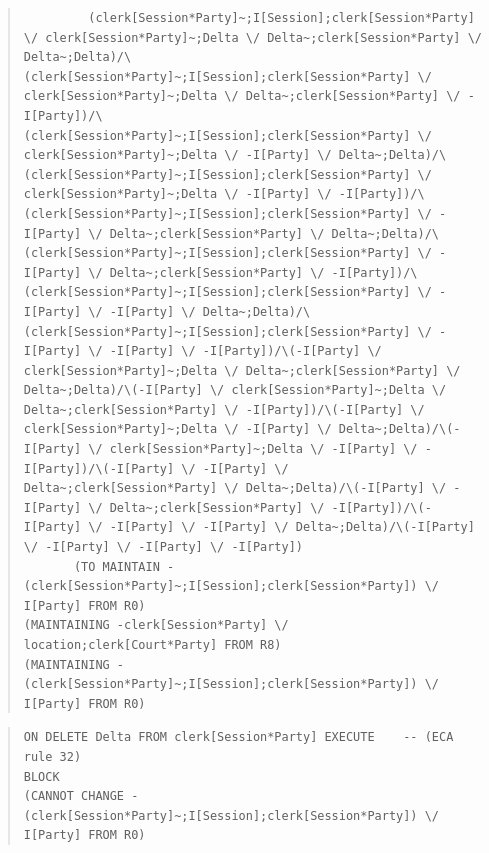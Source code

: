 \documentclass[10pt,a4paper]{report}              %
\theoremstyle{plain}\theorembodyfont{\rmfamily}\newtheorem{definition}{Definition}[section]
\theoremstyle{plain}\theorembodyfont{\rmfamily}\newtheorem{designrule}[definition]{Requirement}
\begin{document}
\begin{quote}
\begin{verbatim}
         (clerk[Session*Party]~;I[Session];clerk[Session*Party] \/ clerk[Session*Party]~;Delta \/ Delta~;clerk[Session*Party] \/ Delta~;Delta)/\(clerk[Session*Party]~;I[Session];clerk[Session*Party] \/ clerk[Session*Party]~;Delta \/ Delta~;clerk[Session*Party] \/ -I[Party])/\(clerk[Session*Party]~;I[Session];clerk[Session*Party] \/ clerk[Session*Party]~;Delta \/ -I[Party] \/ Delta~;Delta)/\(clerk[Session*Party]~;I[Session];clerk[Session*Party] \/ clerk[Session*Party]~;Delta \/ -I[Party] \/ -I[Party])/\(clerk[Session*Party]~;I[Session];clerk[Session*Party] \/ -I[Party] \/ Delta~;clerk[Session*Party] \/ Delta~;Delta)/\(clerk[Session*Party]~;I[Session];clerk[Session*Party] \/ -I[Party] \/ Delta~;clerk[Session*Party] \/ -I[Party])/\(clerk[Session*Party]~;I[Session];clerk[Session*Party] \/ -I[Party] \/ -I[Party] \/ Delta~;Delta)/\(clerk[Session*Party]~;I[Session];clerk[Session*Party] \/ -I[Party] \/ -I[Party] \/ -I[Party])/\(-I[Party] \/ clerk[Session*Party]~;Delta \/ Delta~;clerk[Session*Party] \/ Delta~;Delta)/\(-I[Party] \/ clerk[Session*Party]~;Delta \/ Delta~;clerk[Session*Party] \/ -I[Party])/\(-I[Party] \/ clerk[Session*Party]~;Delta \/ -I[Party] \/ Delta~;Delta)/\(-I[Party] \/ clerk[Session*Party]~;Delta \/ -I[Party] \/ -I[Party])/\(-I[Party] \/ -I[Party] \/ Delta~;clerk[Session*Party] \/ Delta~;Delta)/\(-I[Party] \/ -I[Party] \/ Delta~;clerk[Session*Party] \/ -I[Party])/\(-I[Party] \/ -I[Party] \/ -I[Party] \/ Delta~;Delta)/\(-I[Party] \/ -I[Party] \/ -I[Party] \/ -I[Party])
       (TO MAINTAIN -(clerk[Session*Party]~;I[Session];clerk[Session*Party]) \/ I[Party] FROM R0)
(MAINTAINING -clerk[Session*Party] \/ location;clerk[Court*Party] FROM R8)
(MAINTAINING -(clerk[Session*Party]~;I[Session];clerk[Session*Party]) \/ I[Party] FROM R0)
\end{verbatim}
\end{quote}
\begin{quote}
\begin{verbatim}
ON DELETE Delta FROM clerk[Session*Party] EXECUTE    -- (ECA rule 32)
BLOCK
(CANNOT CHANGE -(clerk[Session*Party]~;I[Session];clerk[Session*Party]) \/ I[Party] FROM R0)
\end{verbatim}
\end{quote}
\end{document}
